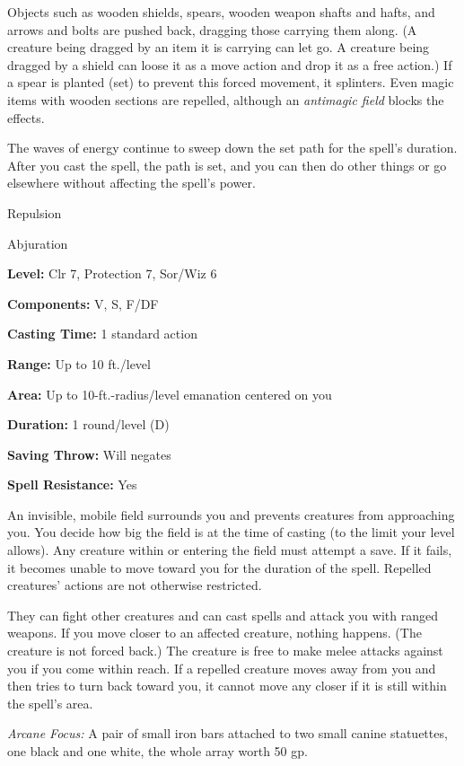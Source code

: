 \documentclass{article}
\begin{document}
Objects such as wooden shields, spears, wooden weapon shafts and hafts, and arrows 
and bolts are pushed back, dragging those carrying them along. (A creature being 
dragged by an item it is carrying can let go. A creature being dragged by a shield 
can loose it as a move action and drop it as a free action.) If a spear is planted 
(set) to prevent this forced movement, it splinters. Even magic items with wooden 
sections are repelled, although an \textit{antimagic field }blocks the effects.

The waves of energy continue to sweep down the set path for the spell's duration. 
After you cast the spell, the path is set, and you can then do other things or 
go elsewhere without affecting the spell's power.

\vspace{12pt}
Repulsion

Abjuration

\textbf{Level:} Clr 7, Protection 7, Sor/Wiz 6

\textbf{Components:} V, S, F/DF

\textbf{Casting Time:} 1 standard action

\textbf{Range:} Up to 10 ft./level

\textbf{Area:} Up to 10-ft.-radius/level emanation centered on you

\textbf{Duration:} 1 round/level (D)

\textbf{Saving Throw: }Will negates

\textbf{Spell Resistance:} Yes

An invisible, mobile field surrounds you and prevents creatures from approaching 
you. You decide how big the field is at the time of casting (to the limit your 
level allows). Any creature within or entering the field must attempt a save. If 
it fails, it becomes unable to move toward you for the duration of the spell. Repelled 
creatures' actions are not otherwise restricted.

They can fight other creatures and can cast spells and attack you with ranged weapons. 
If you move closer to an affected creature, nothing happens. (The creature is not 
forced back.) The creature is free to make melee attacks against you if you come 
within reach. If a repelled creature moves away from you and then tries to turn 
back toward you, it cannot move any closer if it is still within the spell's area.

\textit{Arcane Focus: }A pair of small iron bars attached to two small canine statuettes, 
one black and one white, the whole array worth 50 gp.
\end{document}

